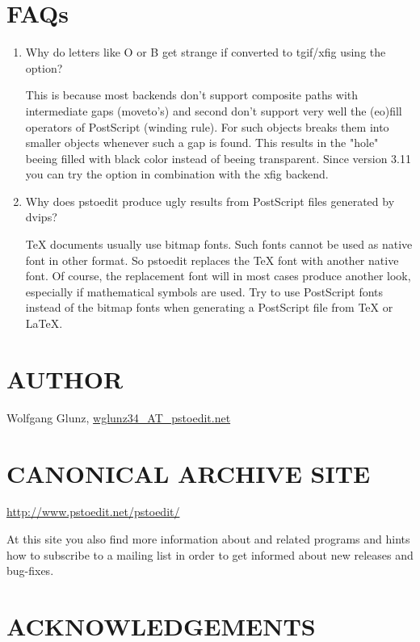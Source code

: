 \documentclass[english,a4paper]{article}
\let\URL\url \let\Email\url \let\File\url
\begin{document}
\section{FAQs}

\begin{enumerate}
\item Why do letters like O or B get strange if converted to tgif/xfig
using the  option?

This is because most backends don't support composite paths with
intermediate gaps (moveto's) and second don't support very well the (eo)fill
operators of PostScript (winding rule). For such objects  breaks
them into smaller objects whenever such a gap is found. This results in the
"hole" beeing filled with black color instead of beeing transparent. Since
version 3.11 you can try the  option in combination with the xfig
backend.


\item Why does pstoedit produce ugly results from PostScript files generated
by dvips?

TeX documents usually use bitmap fonts. Such fonts cannot be used as native
font in other format. So pstoedit replaces the TeX font with another native
font. Of course, the replacement font will in most cases produce another
look, especially if mathematical symbols are used.
Try to use PostScript fonts instead of the bitmap fonts when generating a PostScript file from TeX or LaTeX.


\end{enumerate}

\section{AUTHOR}

Wolfgang Glunz, \Email{wglunz34_AT_pstoedit.net}


\section{CANONICAL ARCHIVE SITE}

\URL{http://www.pstoedit.net/pstoedit/}

At this site you also find more information about  and related
programs and hints how to subscribe to a mailing list in order to get informed
about new releases and bug-fixes.


\section{ACKNOWLEDGEMENTS}
\end{document}

